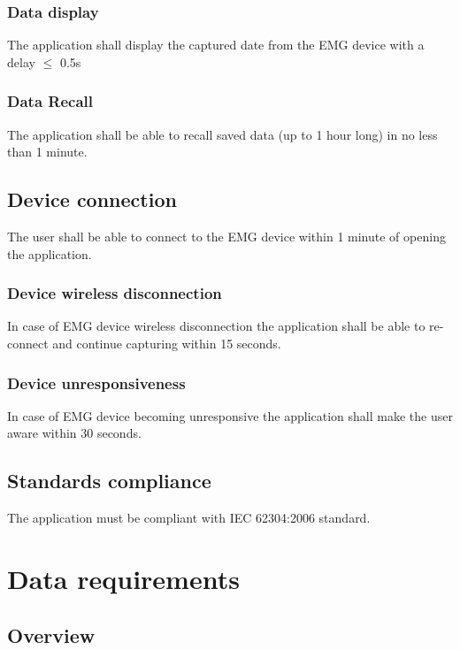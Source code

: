 \documentclass[12pt,a4paper]{article}
\begin{document}
\subsubsection{Data display}

The application shall display the captured date from the EMG device with a delay $\leq$ 0.5s

\subsubsection{Data Recall}

The application shall be able to recall saved data (up to 1 hour long) in no less than 1 minute.

\subsection{Device connection}

The user shall be able to connect to the EMG device within 1 minute of opening the application.

\subsubsection{Device wireless disconnection}

In case of EMG device wireless disconnection the application shall be able to re-connect and continue capturing within 15 seconds.

\subsubsection{Device unresponsiveness}

In case of EMG device becoming unresponsive the application shall make the user aware within 30 seconds.

\subsection{Standards compliance}

The application must be compliant with IEC 62304:2006 standard.

\newpage

\section{Data requirements}

\subsection{Overview}
\end{document}

